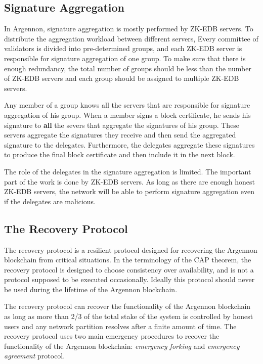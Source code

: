 \subsection{Signature Aggregation}\label{subsec:sig-agg}

In Argennon, signature aggregation is mostly performed by ZK-EDB servers. To distribute the aggregation workload
between different servers, Every committee of validators is divided into pre-determined groups, and each ZK-EDB
server is responsible for signature aggregation of one group. To make sure that there is enough redundancy, the
total number of groups should be less than the number of ZK-EDB servers and each group should be assigned to
multiple ZK-EDB servers.

Any member of a group knows all the servers that are responsible for signature aggregation of his group. When a member
signs a block certificate, he sends his signature to \textbf{all} the severs that aggregate the signatures of his group.
These servers aggregate the signatures they receive and then send the aggregated signature to the delegates.
Furthermore, the delegates aggregate these signatures to produce the final block certificate
and then include it in the next block.

The role of the delegates in the signature aggregation is limited. The important part of the work is done by ZK-EDB
servers. As long as there are enough honest ZK-EDB servers, the network will be able to perform signature aggregation
even if the delegates are malicious.

\subsection{The Recovery Protocol}\label{subsec:recovery}

The recovery protocol is a resilient protocol designed for recovering the Argennon blockchain from critical situations.
In the terminology of the CAP theorem, the recovery protocol is designed to choose consistency over availability,
and is not a protocol supposed to be executed occasionally. Ideally this protocol should never be used
during the lifetime of the Argennon blockchain.

The recovery protocol can recover the functionality
of the Argennon blockchain as long as more than 2/3 of the total stake of the system is controlled by honest users
and any network partition resolves after a finite amount of time. The recovery protocol uses two main emergency
procedures to recover the functionality of the Argennon blockchain: \emph{emergency forking} and \emph{emergency
agreement} protocol.

